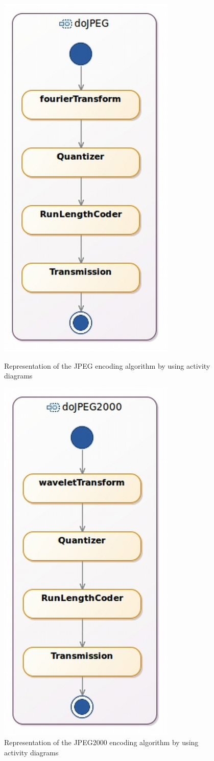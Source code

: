 	\begin{figure}[h]
		\centering
		\begin{minipage}{0.45\textwidth}
			\centering
			\includegraphics[width=.5\columnwidth]{examples/figs/dojpeg.pdf}
			\caption{Representation of the JPEG encoding algorithm by using activity diagrams}
			\label{fig:dojpeg}
		\end{minipage}
		\begin{minipage}{0.45\textwidth}
			\centering
			\includegraphics[width=.5\columnwidth]{examples/figs/dojpeg2000.pdf}
			\caption{Representation of the JPEG2000 encoding algorithm by using activity diagrams}
			\label{fig:dojpeg2000}
		\end{minipage}
	\end{figure}
	

